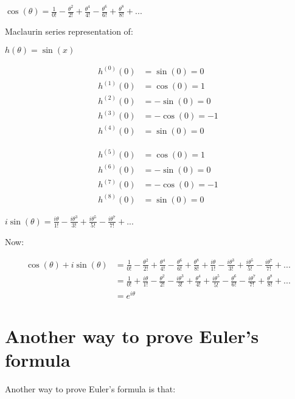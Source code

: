 \documentclass[14pt]{extreport}
\begin{document}
$\displaystyle \cos{(\theta)} = \frac{1}{0!} - \frac{\theta^{2}}{2!} + \frac{\theta^{4}}{4!} - \frac{\theta^{6}}{6!} + \frac{\theta^{8}}{8!} + ...$
\newline

Maclaurin series representation of:
\newline

$\displaystyle h(\theta) = \sin{(x)}$
\newline

\begin{align*}h^{(0)}(0) &= \sin{(0)} = 0\\ h^{(1)}(0) &= \cos{(0)} = 1 \\ h^{(2)}(0) &= -\sin{(0)} = 0 \\ h^{(3)}(0) &= -\cos{(0)} = -1 \\  h^{(4)}(0) &= \sin{(0)} = 0 \end{align*}


\begin{align*} h^{(5)}(0) &= \cos{(0)} = 1 \\ h^{(6)}(0) &= -\sin{(0)} = 0 \\ h^{(7)}(0) &= -\cos{(0)} = -1 \\h^{(8)}(0) &= \sin{(0)} = 0  \end{align*}
\newline

$\displaystyle i\sin{(\theta)} = \frac{i\theta}{1!} - \frac{i\theta^{3}}{3!} + \frac{i\theta^{5}}{5!} - \frac{i\theta^{7}}{7!} + ...$
\newline


Now:
\newline

\begin{align*}\cos{(\theta)} + i \sin{(\theta)} &= \frac{1}{0!} - \frac{\theta^{2}}{2!} + \frac{\theta^{4}}{4!} - \frac{\theta^{6}}{6!} + \frac{\theta^{8}}{8!} + \frac{i\theta}{1!} - \frac{i\theta^{3}}{3!} + \frac{i\theta^{5}}{5!} - \frac{i\theta^{7}}{7!} + ... \\ &= \frac{1}{0!} +  \frac{i\theta}{1!} - \frac{\theta^{2}}{2!} - \frac{i\theta^{3}}{3!} + \frac{\theta^{4}}{4!}  + \frac{i\theta^{5}}{5!} - \frac{\theta^{6}}{6!} - \frac{i\theta^{7}}{7!}  + \frac{\theta^{8}}{8!} + ... \\ &= e^{i\theta}   \end{align*}
\newline


\text{[Q.E.D.]}
\newline


\section{Another way to prove Euler's formula}
Another way to prove Euler's formula is that:
\end{document}
